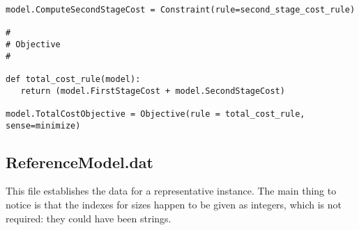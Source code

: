 {\begin{verbatim}
model.ComputeSecondStageCost = Constraint(rule=second_stage_cost_rule)

#
# Objective
#

def total_cost_rule(model):
   return (model.FirstStageCost + model.SecondStageCost)

model.TotalCostObjective = Objective(rule = total_cost_rule, sense=minimize)
\end{verbatim}
}

\subsection{ReferenceModel.dat}

This file establishes the data for a representative instance. The main thing to notice is that the indexes for
sizes happen to be given as integers, which is not required: they could have been strings.

